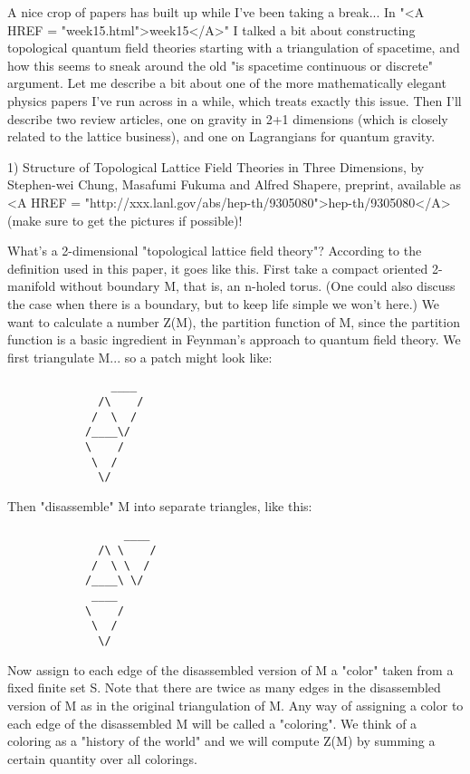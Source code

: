 

A nice crop of papers has built up while I've been taking a break...
In "<A HREF = "week15.html">week15</A>" I talked a bit about constructing topological quantum field
theories starting with a triangulation of spacetime, and how this seems
to sneak around the old "is spacetime continuous or discrete" argument.
Let me describe a bit about one of the more mathematically elegant
physics papers I've run across in a while, which treats exactly this
issue.  Then I'll describe two review articles, one on gravity in 2+1
dimensions (which is closely related to the lattice business), and one
on Lagrangians for quantum gravity.

1)  Structure of Topological Lattice Field Theories in Three Dimensions, by
Stephen-wei Chung, Masafumi Fukuma and Alfred Shapere, preprint,
available as <A HREF = "http://xxx.lanl.gov/abs/hep-th/9305080">hep-th/9305080</A> (make sure to get the pictures if possible)! 

What's a 2-dimensional "topological lattice field theory"?  According to the
definition used in this paper, it goes like this.  First take a compact
oriented 2-manifold without boundary M, that is, an n-holed torus.
(One could also discuss the case when there is a boundary, but to keep
life simple we won't here.)  We want to calculate a number Z(M), the
partition function of M, since the partition function is a basic ingredient
in Feynman's approach to quantum field theory.   We first triangulate
M... so a patch might look like:

\begin{verbatim}
                ____
              /\    /
             /  \  /
            /____\/ 
            \    /   
             \  /          
              \/     
\end{verbatim}
    

Then "disassemble" M into separate triangles, like this:

\begin{verbatim}
                  ____
              /\ \    /
             /  \ \  /
            /____\ \/
             ____ 
            \    /   
             \  /          
              \/     
\end{verbatim}
    

Now assign to each edge of the disassembled version of M a "color"
taken from a fixed finite set S.  Note that there are twice as many
edges in the disassembled version of M as in the original triangulation
of M.   Any way of assigning a color to each edge of the disassembled M
will be called a "coloring".  We think of a coloring as a "history of
the world" and we will compute Z(M) by summing a certain quantity
over all colorings.  

